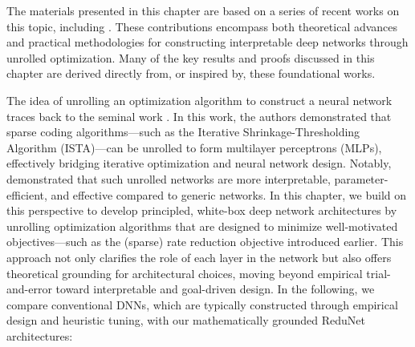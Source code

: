 \documentclass[\toplevelprefix/book-main.tex]{subfiles}
\begin{document}



The materials presented in this chapter are based on a series of recent works on this topic, including \cite{chan2021redunet, wang2024global, wang2025attention, wu2025token, yu2023white}. These contributions encompass both theoretical advances and practical methodologies for constructing interpretable deep networks through unrolled optimization. Many of the key results and proofs discussed in this chapter are derived directly from, or inspired by, these foundational works. 


The idea of unrolling an optimization algorithm to construct a neural network traces back to the seminal work \cite{gregor2010learning}. In this work, the authors demonstrated that sparse coding algorithms—such as the Iterative Shrinkage-Thresholding Algorithm (ISTA)—can be unrolled to form multilayer perceptrons (MLPs), effectively bridging iterative optimization and neural network design. Notably, \cite{monga2019algorithm} demonstrated that such unrolled networks are more interpretable, parameter-efficient, and effective compared to generic networks. In this chapter, we build on this perspective to develop principled, white-box deep network architectures by unrolling optimization algorithms that are designed to minimize well-motivated objectives—such as the (sparse) rate reduction objective introduced earlier. This approach not only clarifies the role of each layer in the network but also offers theoretical grounding for architectural choices, moving beyond empirical trial-and-error toward interpretable and goal-driven design.  In the following, we compare conventional DNNs, which are typically constructed through empirical design and heuristic tuning, with our mathematically grounded ReduNet architectures: 
\end{document}
